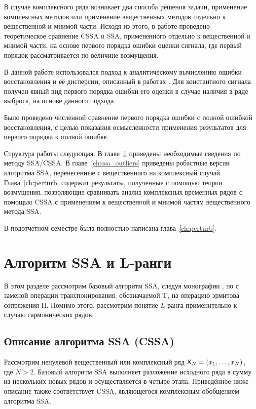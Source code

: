 \documentclass[specialist,
               substylefile = spbu.rtx,
               subf,href,colorlinks=true, 12pt]{disser}
\begin{document}
В случае комплексного ряда возникает два способа решения задачи, применение комплексных методов или применение вещественных методов отдельно к вещественной и мнимой части. Исходя из этого, в работе проведено теоретическое сравнение CSSA и SSA, примененного отдельно к вещественной и мнимой части, на основе первого порядка ошибки оценки сигнала, где первый порядок рассматривается по величине возмущения.

В данной работе использовался подход к аналитическому вычислению ошибки восстановления и её дисперсии, описанный в работах \cite{Nekr2008,Vlas2008}. Для константного сигнала получен явный вид первого порядка ошибки его оценки в случае наличия в ряде выброса, на основе данного подхода.

Было проведено численной сравнение первого порядка ошибки с полной ошибкой восстановления, с целью показания осмысленности применения результатов для первого порядка к полной ошибке.

Структура работы следующая. В главе~\ref{ch:ssa} приведены необходимые сведения по методу SSA/CSSA. В главе~\ref{ch:ssa_outliers} приведены робастные версии алгоритма SSA, перенесенные с вещественного на комплексный случай. Глава~\ref{ch:perturb} содержит результаты, полученные с помощью теории возмущения, позволяющие сравнивать анализ комплексных временных рядов с помощью CSSA с применением к вещественной и мнимой частям  вещественного метода SSA.

В подотчетном семестре была полностью написана глава~\ref{ch:perturb}.

\chapter{Алгоритм SSA и L-ранги}
\label{ch:ssa}
В этом разделе рассмотрим базовый алгоритм SSA, следуя монографии \cite{Golyandina.etal2001}, но с заменой операции транспонирования, обозначаемой $\mathrm{T}$, на операцию эрмитова сопряжения $\mathrm{H}$. Помимо этого, рассмотрим понятие $L$-ранга применительно к случаю гармонических рядов.
\section{Описание алгоритма SSA (CSSA)}
Рассмотрим ненулевой вещественный или комплексный ряд $\textsf{X}_N = (x_1, \ldots, x_{N})$, где $N > 2$. Базовый алгоритм SSA выполняет разложение исходного ряда в сумму из нескольких новых рядов и осуществляется в четыре этапа. Приведённое ниже описание также соответствует CSSA, являющегося комплексным обобщением алгоритма SSA.
\end{document}
